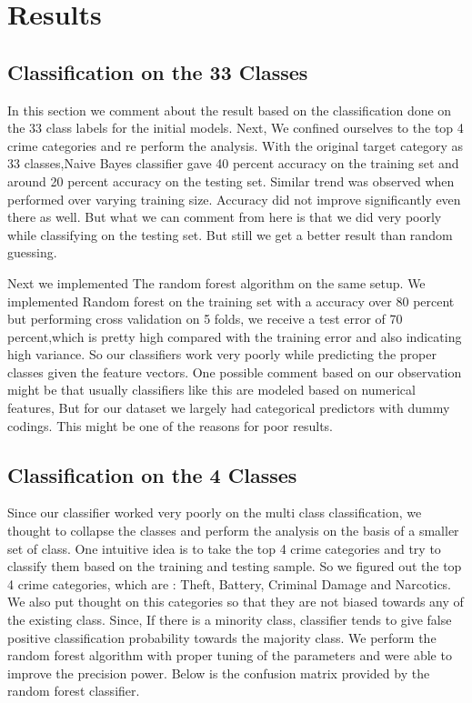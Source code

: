 \documentclass[conference]{IEEEtran}
\begin{document}
\section{Results}
\subsection{Classification on the 33 Classes}
In this section we comment about the result based on the classification done on the 33 class labels for the initial models. Next, We confined ourselves to the top 4 crime categories and re perform the analysis. 
 With the original target category as 33 classes,Naive Bayes classifier gave 40 percent accuracy on the training set and around 20 percent accuracy on the testing set. Similar trend was observed when performed over varying training size. Accuracy did not improve significantly even there as well. But what we can comment from here is that we did very poorly while classifying on the testing set. But still we get a better result than random guessing.
 
 Next we implemented The random forest algorithm on the same setup. We implemented Random forest on the training set with a accuracy over 80 percent but performing cross validation on 5 folds, we receive a test error of 70 percent,which is pretty high compared with the training error and also indicating high variance. So our classifiers work very poorly while predicting the proper classes given the feature vectors. One possible comment based on our observation might be that usually classifiers like this are modeled based on numerical features, But for our dataset we largely had categorical predictors with dummy codings. This might be one of the reasons for poor results. 
  
\subsection{Classification on the 4 Classes}
Since our classifier worked very poorly on the multi class classification, we thought to collapse the classes and perform the analysis on the basis of a smaller set of class. One intuitive idea is to take the top 4 crime categories and try to classify them based on the training and testing sample. So we figured out the top 4 crime categories, which are : Theft, Battery, Criminal Damage and Narcotics. We also put thought on this categories so that they are not biased towards any of the existing class. Since, If there is a minority class, classifier tends to give false positive classification probability towards the majority class. We perform the random forest algorithm with proper tuning of the parameters and were able to improve the precision power. Below is the confusion matrix provided by the random forest classifier.   
    
\end{document}
